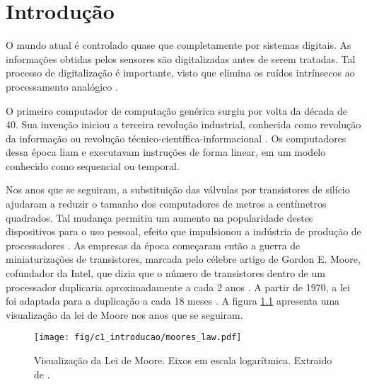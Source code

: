 \documentclass[11pt,a4paper,oneside]{book}
\begin{document}
	\frontmatter
	\tableofcontents
	\mainmatter
	
	\newcommand\qt[1]{\lq\lq{}#1\rq\rq{}}
	\newcommand\qti[1]{\lq\lq{}\textit{#1}\rq\rq{}}
\fi

\chapter{Introdu\c{c}\~ao}\label{CapIntro}


\vspace{0.8cm}
O mundo atual \'e controlado quase que completamente por sistemas digitais.
As informa\c{c}\~oes obtidas pelos sensores s\~ao digitalizadas antes de serem tratadas.
Tal processo de digitaliza\c{c}\~ao \'e importante, visto que elimina os ru\'idos intr\'insecos ao processamento anal\'ogico \cite{chen2004electrical}.

O primeiro computador de computa\c{c}\~ao gen\'erica surgiu por volta da d\'ecada de 40.
Sua inven\c{c}\~ao iniciou a terceira revolu\c{c}\~ao industrial, conhecida como revolu\c{c}\~ao da informa\c{c}\~ao ou revolu\c{c}\~ao t\'ecnico-cient\'ifica-informacional \cite{patterson2005coa}.
Os computadores dessa \'epoca liam e executavam instru\c{c}\~oes de forma linear, em um modelo conhecido como sequencial ou temporal. 

Nos anos que se seguiram, a substituição das válvulas por transistores de sil\'icio ajudaram a reduzir o tamanho dos computadores de metros a cent\'imetros quadrados.
Tal mudan\c{c}a permitiu um aumento na popularidade destes dispositivos para o uso pessoal, efeito que impulsionou a ind\'ustria de produ\c{c}\~ao de processadores \cite{Hennessy2011}.
As empresas da \'epoca come\c{c}aram ent\~ao a guerra de miniaturiza\c{c}\~oes de transistores, marcada pelo c\'elebre artigo de Gordon E. Moore, cofundador da Intel, que dizia que o n\'umero de transistores dentro de um processador duplicaria aproximadamente a cada 2 anos \cite{Moore1965}.
A partir de 1970, a lei foi adaptada para a duplica\c{c}\~ao a cada 18 meses \cite{Hennessy2011}.
A figura \ref{fig:moores_law} apresenta uma visualização da lei de Moore nos anos que se seguiram.

\begin{figure}[h]
	\centering
	\texttt{[image: fig/c1\_introducao/moores\_law.pdf]}
	\caption{Visualização da Lei de Moore. Eixos em escala logarítmica. Extraido de \cite{moore2011}.}
	\label{fig:moores_law}
\end{figure}
\end{document}
